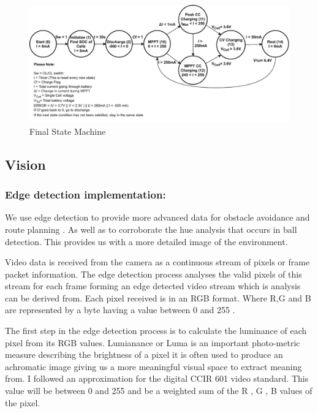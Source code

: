 \documentclass[10pt,twoside]{article}
\begin{document}
\begin{figure}[hbt]
    \centering
    \includegraphics[width = \textwidth]{Final (3).pdf}
    \caption{Final State Machine}
    \label{fig:FinalState}
\end{figure}

\newpage
\subsection{Vision}

\subsubsection{Edge detection implementation:}

We use edge detection to provide more advanced data for obstacle avoidance and route planning . As well as to corroborate the hue analysis that occurs in ball detection. This provides us with a more detailed image of the environment. 

Video data is received from the camera as a continuous stream of pixels or frame packet information. The edge detection process analyses the valid pixels of this stream for each frame forming an edge detected video stream which is analysis can be derived from. Each pixel received is in an RGB format. Where R,G and B are represented by a byte having a value between 0 and 255 . 

The first step in the edge detection process is to calculate the luminance of each pixel from its RGB values. Lumianance or Luma is an important photo-metric measure describing the brightness of a pixel it is often used to produce an achromatic image giving us a more meaningful visual space to extract meaning from. I followed an approximation for the digital CCIR 601 \cite{LumaWikipedia} video standard. This value will be between 0 and 255 and be a weighted sum of the R , G , B values of the pixel. 
\end{document}
